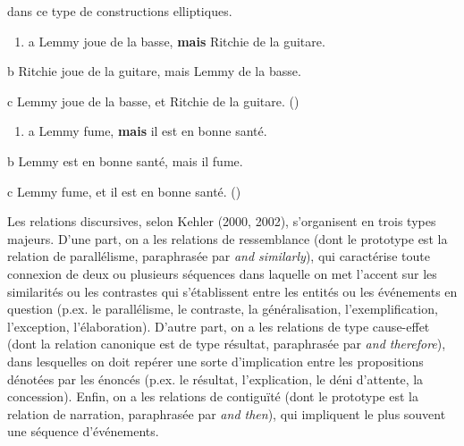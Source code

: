 dans ce type de constructions elliptiques. 


\begin{enumerate}
\item \label{bkm:Ref302318675}a   Lemmy joue de la basse, \textbf{mais} Ritchie de la guitare.


\end{enumerate}
  b  Ritchie joue de la guitare, mais Lemmy de la basse.  

c  Lemmy joue de la basse, et Ritchie de la guitare.      (\citet[42]{Winterstein2010}) 


\begin{enumerate}
\item \label{bkm:Ref302319520}a   Lemmy fume, \textbf{mais} il est en bonne santé.


\end{enumerate}
  b  Lemmy est en bonne santé, mais il fume.  

c  Lemmy fume, et il est en bonne santé.           (\citet[43]{Winterstein2010}) 

Les relations discursives, selon Kehler (2000, 2002), s'organisent en trois types majeurs. D'une part, on a les relations de ressemblance (dont le prototype est la relation de parallélisme, paraphrasée par \textit{and similarly}), qui caractérise toute connexion de deux ou plusieurs séquences dans laquelle on met l'accent sur les similarités ou les contrastes qui s'établissent entre les entités ou les événements en question (p.ex. le parallélisme, le contraste, la généralisation, l'exemplification, l'exception, l'élaboration). D'autre part, on a les relations de type cause-effet (dont la relation canonique est de type résultat, paraphrasée par \textit{and therefore}), dans lesquelles on doit repérer une sorte d'implication entre les propositions dénotées par les énoncés (p.ex. le résultat, l'explication, le déni d'attente, la concession). Enfin, on a les relations de contiguïté (dont le prototype est la relation de narration, paraphrasée par \textit{and then}), qui impliquent le plus souvent une séquence d'événements. 

